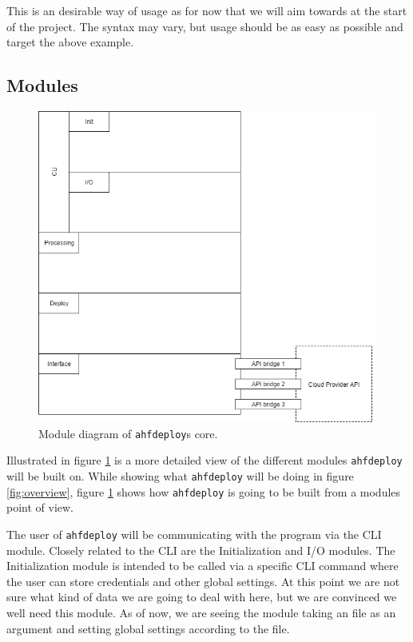 \documentclass[a4paper,15pt,twoside]{article}
\begin{document}
This is an desirable way of usage as for now that we will aim towards at the start of the project. The syntax may vary, but usage should be as easy as possible and target the above example. 

\subsection{Modules}
\begin{figure}[H]
    \centering
    \includegraphics[keepaspectratio, width=14cm]{module.png}
    \caption{Module diagram of \texttt{ahfdeploy}s core.}
    \label{fig:module}
\end{figure}

Illustrated in figure \ref{fig:module} is a more detailed view of the different modules \texttt{ahfdeploy} will be built on. While showing what \texttt{ahfdeploy} will be doing in figure \ref{fig:overview}, figure \ref{fig:module} shows how \texttt{ahfdeploy} is going to be built from a modules point of view. 

The user of \texttt{ahfdeploy} will be communicating with the program via the CLI module. Closely related to the CLI are the Initialization and I/O modules. The Initialization module is intended to be called via a specific CLI command where the user can store credentials and other global settings. At this point we are not sure what kind of data we are going to deal with here, but we are convinced we well need this module. As of now, we are seeing the module taking an file as an argument and setting global settings according to the file.
\end{document}
